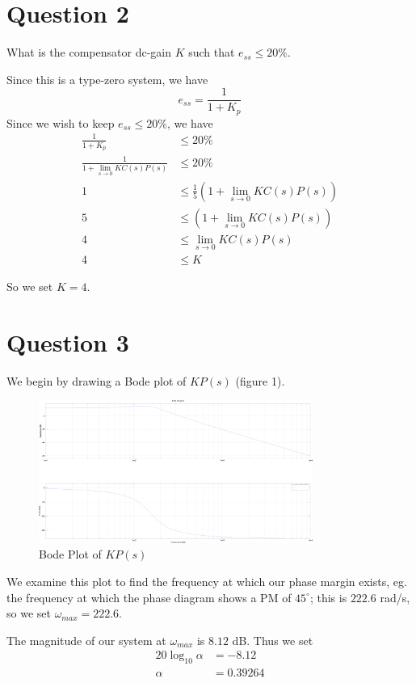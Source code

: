 \documentclass[12pt]{article}
\begin{document}
\section{Question 2}
What is the compensator dc-gain $K$ such that $e_{ss} \leq 20\%$.

Since this is a type-zero system, we have \[ e_{ss} = \frac{1}{1 + K_p} \] Since we wish to keep $e_{ss} \leq 20\%$, we have
\begin{align*}
\frac{1}{1 + K_p} &\leq 20\% \\
\frac{1}{1 + \lim_{s\to 0} KC(s)P(s)} &\leq 20\% \\
1 &\leq \frac{1}{5} (1 + \lim_{s\to 0} KC(s)P(s)) \\
5 &\leq (1 + \lim_{s\to 0} KC(s)P(s)) \\
4 &\leq \lim_{s\to 0} KC(s)P(s) \\
4 &\leq K
\end{align*}

So we set $K = 4$.

\section{Question 3}
We begin by drawing a Bode plot of $KP(s)$ (figure 1).
\begin{figure}[ht]
\centering
\includegraphics[width=0.8\textwidth]{lab5-bode.png}
\caption{Bode Plot of $KP(s)$}
\end{figure}

We examine this plot to find the frequency at which our phase margin exists, eg. the frequency at which the phase diagram shows a PM of $45^\circ$; this is $222.6$ rad/s, so we set $\omega_{max} = 222.6$.

The magnitude of our system at $\omega_{max}$ is $8.12$ dB. Thus we set
\begin{align*}
20\log_{10}\alpha &= -8.12 \\
\alpha &= 0.39264
\end{align*}
\end{document}
